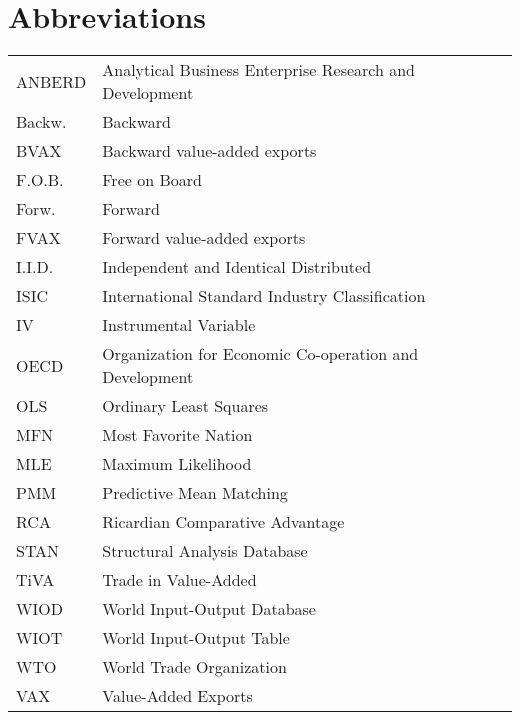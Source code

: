 \documentclass[11pt,leqno,a4paper]{scrbook}
\begin{document}


\frontmatter
{}

\pagestyle{empty}
\tableofcontents

\restoregeometry
\setcounter{equation}{1}
\setcounter{tocdepth}{1}


\chapter*{Abbreviations}\label{av}


\begin{tabular}{ll}
ANBERD&Analytical Business Enterprise Research and Development \\
Backw. & Backward \\
BVAX & Backward value-added exports \\
F.O.B. & Free on Board  \\
Forw. & Forward \\
FVAX & Forward value-added exports \\
I.I.D. & Independent and Identical Distributed \\
ISIC & International Standard Industry Classification \\
IV & Instrumental Variable  \\
OECD & Organization for Economic Co-operation and Development \\
OLS & Ordinary Least Squares \\
MFN & Most Favorite Nation\\
MLE & Maximum Likelihood \\
PMM& Predictive Mean Matching \\
RCA & Ricardian Comparative Advantage \\
STAN & Structural Analysis Database \\
TiVA& Trade in Value-Added \\
WIOD & World Input-Output Database \\
WIOT& World Input-Output Table \\
WTO & World Trade Organization \\
VAX & Value-Added Exports \\
\end{tabular}
\listoffigures
\listoftables
\end{document}

